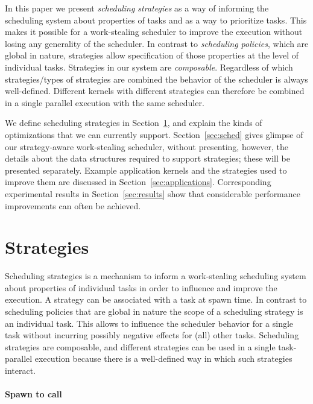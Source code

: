 \documentclass[a4paper,11pt]{article}
\begin{document}
In this paper we present \emph{scheduling strategies} as a way of
informing the scheduling system about properties of tasks and as a way
to prioritize tasks. This makes it possible for a work-stealing scheduler
to improve the execution without losing any generality of the
scheduler. In contrast to \emph{scheduling policies}, which are global
in nature, strategies allow specification of those properties at the
level of individual tasks. Strategies in our system are
\emph{composable}. Regardless of which strategies/types of strategies
are combined the behavior of the scheduler is always
well-defined. Different kernels with different strategies can
therefore be combined in a single parallel execution with the same
scheduler.

We define scheduling strategies in Section~\ref{sec:strategies}, and
explain the kinds of optimizations that we can currently support.
Section~\ref{sec:sched} gives glimpse of our strategy-aware
work-stealing scheduler, without presenting, however, the details
about the data structures required to support strategies; these will
be presented separately.  Example application kernels and the
strategies used to improve them are discussed in
Section~\ref{sec:applications}. Corresponding experimental results in
Section~\ref{sec:results} show that considerable performance
improvements can often be achieved.

\section{Strategies}
\label{sec:strategies}

Scheduling strategies is a mechanism to inform a work-stealing
scheduling system about properties of individual tasks in order to
influence and improve the execution. A strategy can be
associated with a task at spawn time. In contrast to scheduling
policies that are global in nature the scope of a scheduling
strategy is an individual task. This allows to influence the scheduler
behavior for a single task without incurring possibly negative effects
for (all) other tasks. Scheduling strategies are composable, and
different strategies can be used in a single task-parallel
execution because there is a well-defined way in which such strategies
interact.

\paragraph{Spawn to call}
\end{document}
